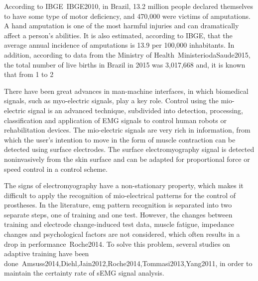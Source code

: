 \documentclass[a4paper, 12pt]{ppgeb}
\makeatletter
\renewcommand{\section}{\@startsection
{section}
{1}
{0mm}
{-\baselineskip}
{0.5\baselineskip}
{\large\bfseries\scshape}}
\makeatother
\begin{document}

\vspace{14pt}



According to \ac{IBGE}~\cite{mainreferences}{IBGE2010}, in Brazil, 13.2 million people declared themselves to have some type of motor deficiency, and 470,000 were victims of amputations. A hand amputation is one of the most harmful injuries and can dramatically affect a person's abilities. It is also estimated, according to IBGE, that the average annual incidence of amputations is 13.9 per 100,000 inhabitants. In addition, according to data from the Ministry of Health~\cite{mainreferences}{MinisteriodaSaude2015}, the total number of live births in Brazil in 2015 was 3,017,668 and, it is known that from 1 to 2%

There have been great advances in man-machine interfaces, in which biomedical signals, such as myo-electric signals, play a key role. Control using the mio-electric signal is an advanced technique, subdivided into detection, processing, classification and application of EMG signals to control human robots or rehabilitation devices. The mio-electric signals are very rich in information, from which the user's intention to move in the form of muscle contraction can be detected using surface electrodes. The surface electromyography signal is detected noninvasively from the skin surface and can be adapted for proportional force or speed control in a control scheme.

The signs of electromyography have a non-stationary property, which makes it difficult to apply the recognition of mio-electrical patterns for the control of prostheses. In the literature, emg pattern recognition is separated into two separate steps, one of training and one test. However, the changes between training and electrode change-induced test data, muscle fatigue, impedance changes and psychological factors are not considered, which often results in a drop in performance~\cite{mainreferences}{Roche2014}. To solve this problem, several studies on adaptive training have been done~\cite{mainreferences}{Amsuss2014,Diehl,Jain2012,Roche2014,Tommasi2013,Yang2011}, in order to maintain the certainty rate of \ac{sEMG} signal analysis.
\end{document}
